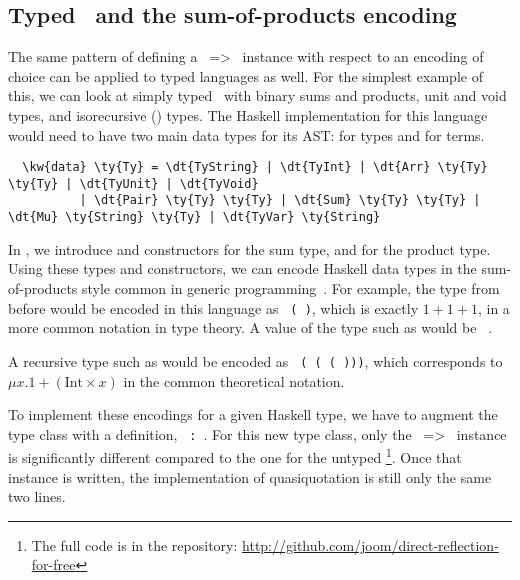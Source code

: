 
\subsection{Typed \lc\ and the sum-of-products encoding}

The same pattern of defining a \mbox{  =>  }
instance with respect to an encoding of choice can be applied to typed
languages as well.
For the simplest example of this, we can look at simply typed \lc\ with binary sums and products, unit and void types, and isorecursive (\textmu) types. The Haskell implementation for this language would need to have two main data types for its AST:  for types and  for terms.

\begin{Verbatim}
  \kw{data} \ty{Ty} = \dt{TyString} | \dt{TyInt} | \dt{Arr} \ty{Ty} \ty{Ty} | \dt{TyUnit} | \dt{TyVoid}
          | \dt{Pair} \ty{Ty} \ty{Ty} | \dt{Sum} \ty{Ty} \ty{Ty} | \dt{Mu} \ty{String} \ty{Ty} | \dt{TyVar} \ty{String}
\end{Verbatim}

In , we introduce  and  constructors for the sum type, and  for the product type. Using these types and constructors, we can encode Haskell data types in the sum-of-products style common in generic programming~\cite{magalhaes2010generic}. For example, the  type from before would be encoded in this language as \mbox{\texttt{  (  )}}, which is exactly $1 + 1 + 1$, in a more common notation in type theory. A value of the type  such as  would be \mbox{\texttt{ }}.

A recursive type such as {} would be encoded as {\texttt{  (  (  ( )))}}, which corresponds to $\mu x. 1 + (\text{Int} \times x)$ in the common theoretical notation.

To implement these encodings for a given Haskell type, we have to augment the  type class with a definition, \mbox{\texttt{ : }}.
For this new  type class, only the \mbox{  =>  } instance is significantly different compared to the one for the untyped \lc\footnote{The full code is in the repository: \url{http://github.com/joom/direct-reflection-for-free}}. Once that instance is written, the implementation of quasiquotation is still only the same two lines.

